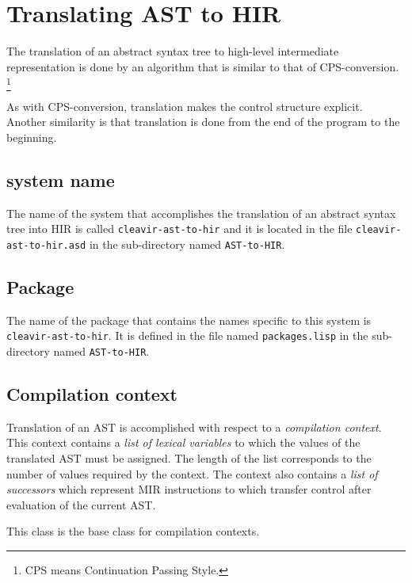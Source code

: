 \chapter{Translating AST to HIR}
\label{chap-translating-ast-to-hir}

The translation of an abstract syntax tree
 to high-level intermediate
representation  is done by an algorithm that is
similar to that of CPS-conversion.%
\footnote{CPS means Continuation Passing Style.}

As with CPS-conversion, translation makes the control structure
explicit.  Another similarity is that translation is done from the end
of the program to the beginning.

\section{\asdf{} system name}

The name of the \asdf{} system that accomplishes the translation of an
abstract syntax tree into HIR is called \texttt{cleavir-ast-to-hir}
and it is located in the file \texttt{cleavir-ast-to-hir.asd} in the
sub-directory named \texttt{AST-to-HIR}.

\section{Package}

The name of the package that contains the names specific to this
system is \texttt{cleavir-ast-to-hir}.  It is defined in the file
named \texttt{packages.lisp} in the sub-directory named
\texttt{AST-to-HIR}.

\section{Compilation context}

Translation of an AST is accomplished with respect to a
\emph{compilation context}.  This context contains a \emph{list of
  lexical variables} to which the values of the translated AST must be
assigned.  The length of the list corresponds to the number of values
required by the context.  The context also contains a \emph{list of
  successors} which represent MIR instructions to which transfer
control after evaluation of the current AST.


This class is the base class for compilation contexts.

